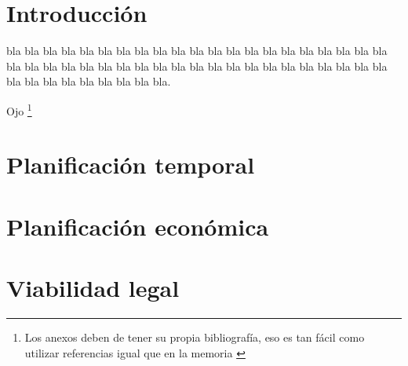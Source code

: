 
\section{Introducción}

bla bla bla bla bla bla bla bla bla bla bla bla bla bla bla bla bla bla bla bla bla bla bla bla bla bla bla bla bla bla bla bla bla bla bla bla bla bla bla bla bla bla bla bla bla bla bla bla bla bla bla.

Ojo \footnote{Los anexos deben de tener su propia bibliografía, eso es tan fácil como utilizar referencias igual que en la memoria \cite{bortolot2005}}

\section{Planificación temporal}

\section{Planificación económica}

\section{Viabilidad legal}

